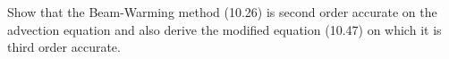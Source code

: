 

Show that the Beam-Warming method (10.26) is second order accurate on the
advection equation and also derive the modified equation (10.47) on which it
is third order accurate.

